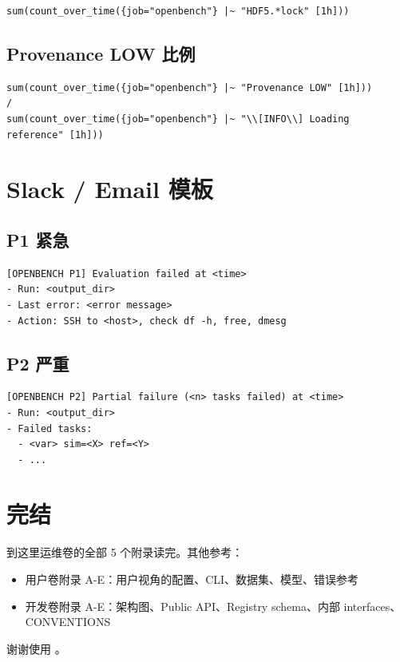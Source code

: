 \begin{verbatim}
sum(count_over_time({job="openbench"} |~ "HDF5.*lock" [1h]))
\end{verbatim}

\subsection{Provenance LOW 比例}

\begin{verbatim}
sum(count_over_time({job="openbench"} |~ "Provenance LOW" [1h]))
/
sum(count_over_time({job="openbench"} |~ "\\[INFO\\] Loading reference" [1h]))
\end{verbatim}

\section{Slack / Email 模板}

\subsection{P1 紧急}

\begin{verbatim}
[OPENBENCH P1] Evaluation failed at <time>
- Run: <output_dir>
- Last error: <error message>
- Action: SSH to <host>, check df -h, free, dmesg
\end{verbatim}

\subsection{P2 严重}

\begin{verbatim}
[OPENBENCH P2] Partial failure (<n> tasks failed) at <time>
- Run: <output_dir>
- Failed tasks:
  - <var> sim=<X> ref=<Y>
  - ...
\end{verbatim}

\section{完结}

到这里运维卷的全部 5 个附录读完。其他参考：

\begin{itemize}
  \item 用户卷附录 A-E：用户视角的配置、CLI、数据集、模型、错误参考
  \item 开发卷附录 A-E：架构图、Public API、Registry schema、内部 interfaces、CONVENTIONS
\end{itemize}

谢谢使用 \openbench{}。
